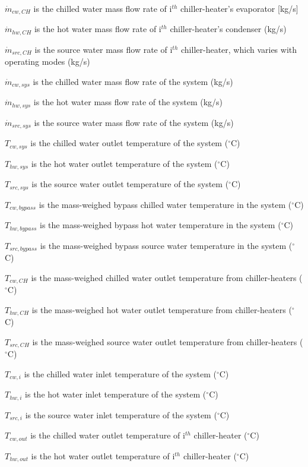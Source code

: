 \({\dot m_{cw,CH}}\) is the chilled water mass flow rate of i\(^{th}\) chiller-heater's evaporator {[}kg/s{]}

\({\dot m_{hw,CH}}\) is the hot water mass flow rate of i\(^{th}\) chiller-heater's condenser (kg/s)

\({\dot m_{src,CH}}\) is the source water mass flow rate of i\(^{th}\) chiller-heater, which varies with operating modes (kg/s)

\({\dot m_{cw,sys}}\) is the chilled water mass flow rate of the system (kg/s)

\({\dot m_{hw,sys}}\) is the hot water mass flow rate of the system (kg/s)

\({\dot m_{src,sys}}\) is the source water mass flow rate of the system (kg/s)

\({T_{cw,sys}}\) is the chilled water outlet temperature of the system (\(^{\circ}\)C)

\({T_{hw,sys}}\) is the hot water outlet temperature of the system (\(^{\circ}\)C)

\({T_{src,sys}}\) is the source water outlet temperature of the system (\(^{\circ}\)C)

\({T_{cw,bypass}}\) is the mass-weighed bypass chilled water temperature in the system (\(^{\circ}\)C)

\({T_{hw,bypass}}\) is the mass-weighed bypass hot water temperature in the system (\(^{\circ}\)C)

\({T_{src,bypass}}\) is the mass-weighed bypass source water temperature in the system (\(^{\circ}\)C)

\({T_{cw,CH}}\) is the mass-weighed chilled water outlet temperature from chiller-heaters (\(^{\circ}\)C)

\({T_{hw,CH}}\) is the mass-weighed hot water outlet temperature from chiller-heaters (\(^{\circ}\)C)

\({T_{src,CH}}\) is the mass-weighed source water outlet temperature from chiller-heaters (\(^{\circ}\)C)

\({T_{cw,i}}\) is the chilled water inlet temperature of the system (\(^{\circ}\)C)

\({T_{hw,i}}\) is the hot water inlet temperature of the system (\(^{\circ}\)C)

\({T_{src,i}}\) is the source water inlet temperature of the system (\(^{\circ}\)C)

\({T_{cw,out}}\) is the chilled water outlet temperature of i\(^{th}\) chiller-heater (\(^{\circ}\)C)

\({T_{hw,out}}\) is the hot water outlet temperature of i\(^{th}\) chiller-heater (\(^{\circ}\)C)

